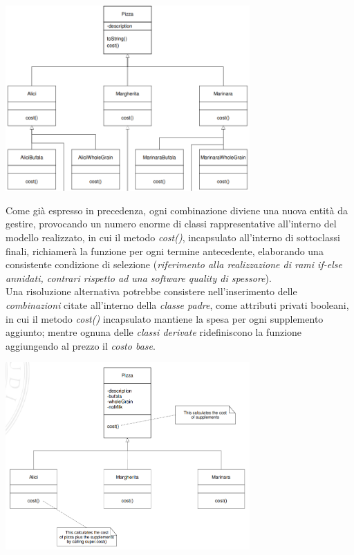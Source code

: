 \documentclass{article}
\begin{document}
\begin{center}
    \includegraphics[width=0.7\textwidth]{foto 3.png}
\end{center}
Come già espresso in precedenza, ogni combinazione diviene una nuova entità da gestire, provocando un numero enorme di classi rappresentative all'interno del modello realizzato, in cui il metodo \textit{cost()}, incapsulato all'interno di sottoclassi finali, richiamerà la funzione per ogni termine antecedente, elaborando una consistente condizione di selezione (\textit{riferimento alla realizzazione di rami if-else annidati, contrari rispetto ad una software quality di spessore}).\vspace*{14pt}\\
Una risoluzione alternativa potrebbe consistere nell'inserimento delle \textit{combinazioni} citate all'interno della \textit{classe padre}, come attributi privati booleani, in cui il metodo \textit{cost()} incapsulato mantiene la spesa per ogni supplemento aggiunto; mentre ognuna delle \textit{classi derivate} ridefiniscono la funzione aggiungendo al prezzo il \textit{costo base}.\vspace*{7pt}
\begin{center}
    \includegraphics[width=0.7\textwidth]{foto 4.png}
\end{center}  
\end{document}
